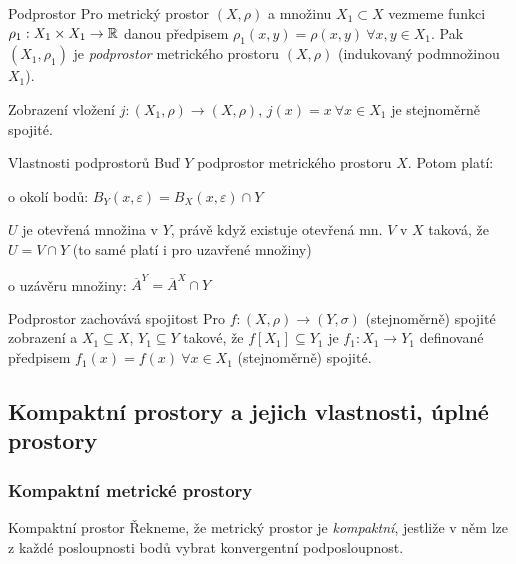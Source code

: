 \begin{definiceN}{Podprostor}
Pro metrický prostor $(X,\rho)$ a množinu $X_1\subset X$ vezmeme funkci $\rho_1:X_1\times X_1\to\mathbb{R}$ danou předpisem $\rho_1(x,y)=\rho(x,y)\ \forall x,y\in X_1$. Pak $(X_1,\rho_1)$ je \emph{podprostor} metrického prostoru $(X,\rho)$ (indukovaný podmnožinou $X_1$).
\end{definiceN}

\begin{poznamka}
Zobrazení vložení $j:(X_1,\rho)\to(X,\rho)$, $j(x)=x\ \forall x\in X_1$ je stejnoměrně spojité.
\end{poznamka}

\begin{vetaN}{Vlastnosti podprostorů}
Buď $Y$ podprostor metrického prostoru $X$. Potom platí:
\begin{penumerate}
    \item o okolí bodů: $B_Y(x,\varepsilon)=B_X(x,\varepsilon)\cap Y$
    \item $U$ je otevřená množina v $Y$, právě když existuje otevřená mn. $V$ v $X$ taková, že $U=V\cap Y$ (to samé platí i pro uzavřené množiny)
    \item o uzávěru množiny: $\overline{A}^Y=\overline{A}^X\cap Y$
\end{penumerate}
\end{vetaN}

\begin{vetaN}{Podprostor zachovává spojitost}
Pro $f:(X,\rho)\to (Y,\sigma)$ (stejnoměrně) spojité zobrazení a $X_1\subseteq X$, $Y_1\subseteq Y$ takové, že $f[X_1]\subseteq Y_1$ je $f_1:X_1\to Y_1$ definované předpisem $f_1(x)=f(x)\ \forall x\in X_1$ (stejnoměrně) spojité.
\end{vetaN}

\subsection{Kompaktní prostory a jejich vlastnosti, úplné prostory}

\subsubsection*{Kompaktní metrické prostory}

\begin{definiceN}{Kompaktní prostor}
Řekneme, že metrický prostor je \emph{kompaktní}, jestliže v něm lze z každé posloupnosti bodů vybrat konvergentní podposloupnost.
\end{definiceN}

